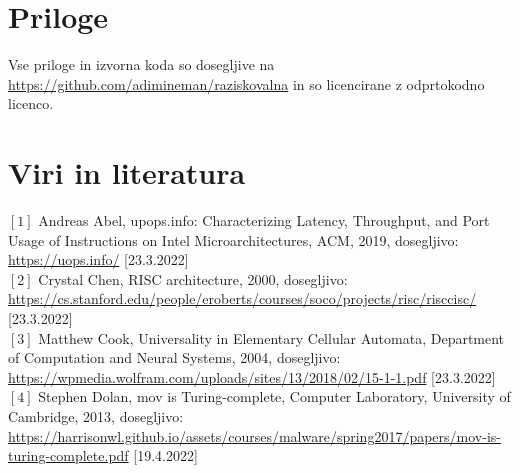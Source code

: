 \documentclass[12pt]{article}
\begin{document}
\section{Priloge}

Vse priloge in izvorna koda so dosegljive na \url{https://github.com/adimineman/raziskovalna} in so licencirane z odprtokodno licenco.

\lstset{
  basicstyle=\tiny,
  breaklines=true,
  frame=single,
  stepnumber=5,
}









%



\pagebreak
\section{Viri in literatura}
$[1]$ Andreas Abel, upops.info: Characterizing Latency, Throughput, and Port Usage of Instructions on Intel Microarchitectures, ACM, 2019, dosegljivo: \url{https://uops.info/} [23.3.2022]\\
$[2]$ Crystal Chen, RISC architecture, 2000, dosegljivo: \url{https://cs.stanford.edu/people/eroberts/courses/soco/projects/risc/risccisc/} [23.3.2022]\\
$[3]$ Matthew Cook, Universality in Elementary Cellular Automata, Department of Computation and Neural Systems, 2004, dosegljivo: \url{https://wpmedia.wolfram.com/uploads/sites/13/2018/02/15-1-1.pdf} [23.3.2022]\\
$[4]$ Stephen Dolan, mov is Turing-complete, Computer Laboratory, University of Cambridge, 2013, dosegljivo: \url{https://harrisonwl.github.io/assets/courses/malware/spring2017/papers/mov-is-turing-complete.pdf} [19.4.2022]\\

\end{document}
